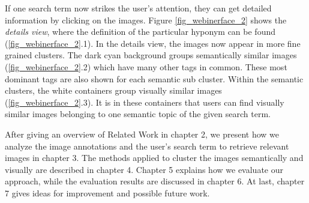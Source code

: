 If one search term now strikes the user's attention, they can get detailed information by clicking on the images.
Figure \ref{fig_webinerface_2} shows the \emph{details view}, where the definition of the particular hyponym can be found (\ref{fig_webinerface_2}.1).
In the details view, the images now appear in more fine grained clusters.
The dark cyan background groups semantically similar images (\ref{fig_webinerface_2}.2) which have many other tags in common. These most dominant tags are also shown for each semantic sub cluster.
Within the semantic clusters, the white containers group visually similar images (\ref{fig_webinerface_2}.3). It is in these containers that users can find visually similar images belonging to one semantic topic of the given search term.

\bigskip

After giving an overview of Related Work in chapter 2, we present how we analyze the image annotations and the user's search term to retrieve relevant images in chapter 3. The methods applied to cluster the images semantically and visually are described in chapter 4. Chapter 5 explains how we evaluate our approach, while the evaluation results are discussed in chapter 6. At last, chapter 7 gives ideas for improvement and possible future work.
